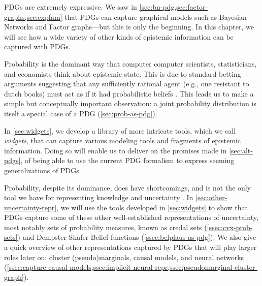     \label{chap:repr-tools}

PDGs are extremely expressive.
We saw in \cref{sec:bn-pdg,sec:factor-graphs,sec:expfam} that PDGs
can capture graphical models such as Bayesian Networks and Factor graphs---but this is only the beginning. 
%
In this chapter, we will see how a wide variety of other kinds of epistemic information can be captured with PDGs.


Probability is the dominant way that computer computer scientists,
statisticians, and economists
think about epistemic state.
This is due to standard betting arguments suggesting that any sufficiently rational agent (e.g., one resistant to dutch books)
must act as if it had probabilistic beliefs \citep{sep-dutch-book,savage}.
This leads us to make a simple but conceptually important observation: a joint probability distribution is itself a special case of a PDG (\cref{sec:prob-as-pdg}). 
%
%

In \cref{sec:widgets}, we develop a library of more intricate tools, which we call \emph{widgets}, that can capture various modeling tools and fragments of epistemic information.
%
Doing so will enable us to deliver on the promises made in \cref{sec:alt-pdgs}, of being able to use the current PDG formalism to express seeming generalizations of PDGs. 

Probability, despite its dominance, does have shortcomings, and is not the only tool we have for representing knowledge and uncertainty \citep[\S2]{halpern-RAU}.
In \cref{sec:other-uncertainty-repr}, we will use the tools developed in \cref{sec:widgets} to show that PDGs capture some of these other well-established representations of uncertainty, most notably sets of probability measures, known as credal sets \citep{Walley1991-SRIP} (\cref{ssec:cvx-prob-sets}) and Dempster-Shafer Belief functions \citep{shafer1976mathematical} (\cref{ssec:belplaus-as-pdg}).
We also give a quick overview of other representations captured by PDGs that will play larger roles later on: cluster (pseudo)marginals, causal models, and neural networks (\cref{ssec:capture-causal-models,ssec:implicit-neural-repr,ssec:pseudomarginal-cluster-graph}). 

